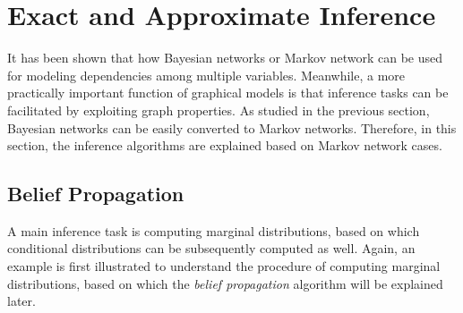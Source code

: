 \section{Exact and Approximate Inference}
\label{sec:inference}
It has been shown that how Bayesian networks or Markov network can be used for modeling dependencies among multiple variables. Meanwhile, a more practically important 
function of graphical models is that inference tasks can be facilitated by exploiting graph properties.           
As studied in the previous section, Bayesian networks can be easily converted to Markov networks. Therefore, in this section, the inference algorithms are explained based on 
Markov network cases.   
\subsection{Belief Propagation}
A main inference task is computing marginal distributions, based on which conditional distributions can be subsequently computed as well.    
Again, an example is first illustrated to understand the procedure of computing marginal distributions, based on which the \emph{belief propagation} algorithm will be explained  
later. 

